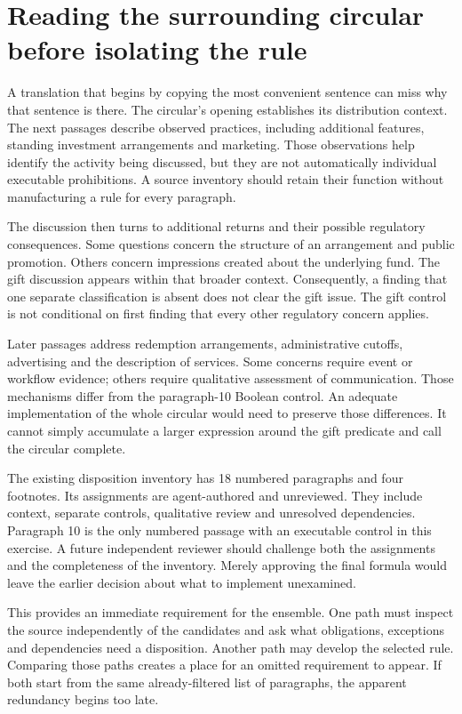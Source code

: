 \documentclass[12pt,a4paper,oneside,openany]{book}
\begin{document}
\section{Reading the surrounding circular before isolating the rule}
\label{merge:M02:01}

\label{sec:circular-context}
A translation that begins by copying the most convenient sentence can miss why
that sentence is there. The circular's opening establishes its distribution
context. The next passages describe observed practices, including additional
features, standing investment arrangements and marketing. Those observations
help identify the activity being discussed, but they are not automatically
individual executable prohibitions. A source inventory should retain their
function without manufacturing a rule for every paragraph.

The discussion then turns to additional returns and their possible regulatory
consequences. Some questions concern the structure of an arrangement and public
promotion. Others concern impressions created about the underlying fund. The
gift discussion appears within that broader context. Consequently, a finding
that one separate classification is absent does not clear the gift issue. The
gift control is not conditional on first finding that every other regulatory
concern applies.

Later passages address redemption arrangements, administrative cutoffs,
advertising and the description of services. Some concerns require event or
workflow evidence; others require qualitative assessment of communication.
Those mechanisms differ from the paragraph-10 Boolean control. An adequate
implementation of the whole circular would need to preserve those differences.
It cannot simply accumulate a larger expression around the gift predicate and
call the circular complete.

The existing disposition inventory has 18 numbered paragraphs and four
footnotes. Its assignments are agent-authored and unreviewed. They include
context, separate controls, qualitative review and unresolved dependencies.
Paragraph 10 is the only numbered passage with an executable control in this
exercise. A future independent reviewer should challenge both the assignments
and the completeness of the inventory. Merely approving the final formula would
leave the earlier decision about what to implement unexamined.

This provides an immediate requirement for the ensemble. One path must inspect
the source independently of the candidates and ask what obligations, exceptions
and dependencies need a disposition. Another path may develop the selected
rule. Comparing those paths creates a place for an omitted requirement to
appear. If both start from the same already-filtered list of paragraphs, the
apparent redundancy begins too late.
\end{document}
